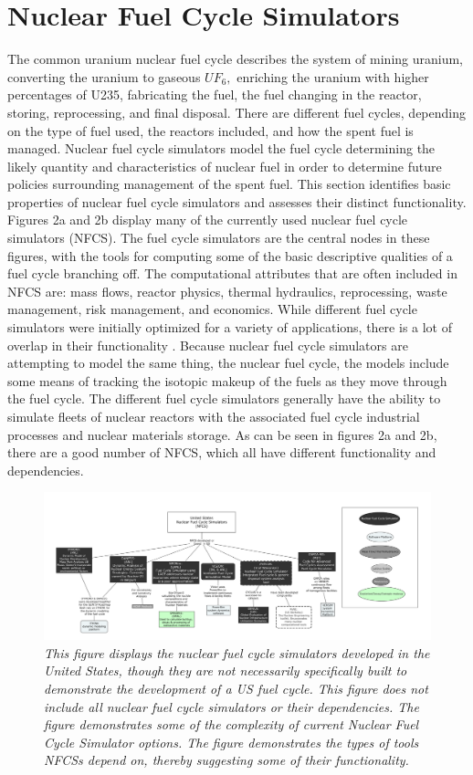 \documentclass[12pt]{UIdahoMastersThesis}
\begin{document}
\section{Nuclear Fuel Cycle Simulators}
The common uranium nuclear fuel cycle describes the system of mining uranium, converting the uranium to gaseous $UF_6,$ enriching the uranium with higher percentages of U235, fabricating the fuel, the fuel changing in the reactor, storing, reprocessing, and final disposal. There are different fuel cycles, depending on the type of fuel used, the reactors included, and how the spent fuel is managed. Nuclear fuel cycle simulators model the fuel cycle determining the likely quantity and characteristics of nuclear fuel in order to determine future policies surrounding management of the spent fuel. 
This section identifies basic properties of nuclear fuel cycle simulators and assesses their distinct functionality. Figures 2a and 2b display many of the currently used nuclear fuel cycle simulators (NFCS). The fuel cycle simulators are the central nodes in these figures, with the tools for computing some of the basic descriptive qualities of a fuel cycle branching off. The computational attributes that are often included in NFCS are: mass flows, reactor physics, thermal hydraulics, reprocessing, waste management, risk management, and economics. While different fuel cycle simulators were initially optimized for a variety of applications, there is a lot of overlap in their functionality \cite {Guerin2009}. Because nuclear fuel cycle simulators are attempting to model the same thing, the nuclear fuel cycle, the models include some means of tracking the isotopic makeup of the fuels as they move through the fuel cycle. The different fuel cycle simulators generally have the ability to simulate fleets of nuclear reactors with the associated fuel cycle industrial processes and nuclear materials storage. As can be seen in figures 2a and 2b, there are a good number of NFCS, which all have different functionality and dependencies.  
\begin{figure}
\includegraphics[width=\textwidth]{US_FUEL_TOOLS.png}
\caption{\small \sl This figure displays the nuclear fuel cycle simulators developed in the United States, though they are not necessarily specifically built to demonstrate the development of a US fuel cycle. This figure does not include all nuclear fuel cycle simulators or their dependencies.  The figure demonstrates some of the complexity of current Nuclear Fuel Cycle Simulator options. The figure demonstrates the types of tools NFCSs depend on, thereby suggesting some of their functionality.}
\end{figure}
\end{document}
